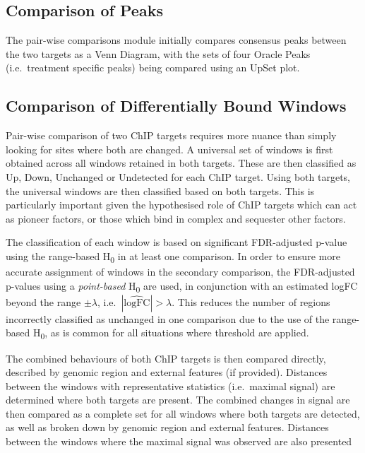 \documentclass[
]{book}
\begin{document}
\hypertarget{comparison-of-peaks}{%
\subsection*{Comparison of Peaks}\label{comparison-of-peaks}}

The pair-wise comparisons module initially compares consensus peaks between the two targets as a Venn Diagram, with the sets of four Oracle Peaks (i.e.~treatment specific peaks) being compared using an UpSet plot.

\hypertarget{comparison-of-differentially-bound-windows}{%
\subsection*{Comparison of Differentially Bound Windows}\label{comparison-of-differentially-bound-windows}}

Pair-wise comparison of two ChIP targets requires more nuance than simply looking for sites where both are changed.
A universal set of windows is first obtained across all windows retained in both targets.
These are then classified as Up, Down, Unchanged or Undetected for each ChIP target.
Using both targets, the universal windows are then classified based on both targets.
This is particularly important given the hypothesised role of ChIP targets which can act as pioneer factors\citep{pioneerfactors}, or those which bind in complex and sequester other factors\citep{hickeynatmed}.

The classification of each window is based on significant FDR-adjusted p-value using the range-based H\textsubscript{0} in at least one comparison.
In order to ensure more accurate assignment of windows in the secondary comparison, the FDR-adjusted p-values using a \emph{point-based} H\textsubscript{0} are used, in conjunction with an estimated logFC beyond the range \(\pm\lambda\), i.e.~\(|\widehat{\text{logFC}}| > \lambda\).
This reduces the number of regions incorrectly classified as unchanged in one comparison due to the use of the range-based H\textsubscript{0}, as is common for all situations where threshold are applied.

The combined behaviours of both ChIP targets is then compared directly, described by genomic region and external features (if provided).
Distances between the windows with representative statistics (i.e.~maximal signal) are determined where both targets are present.
The combined changes in signal are then compared as a complete set for all windows where both targets are detected, as well as broken down by genomic region and external features.
Distances between the windows where the maximal signal was observed are also presented
\end{document}
